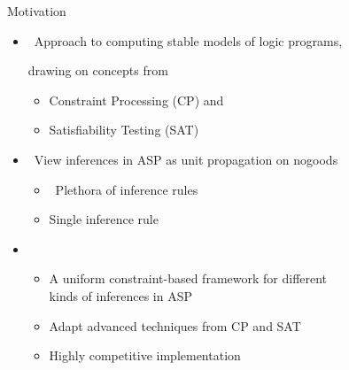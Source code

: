 \begin{frame}{Motivation}
  \bigskip
  \begin{itemize}
  \item<1-> \ Approach to computing stable models of logic programs,

    drawing on concepts from
    \begin{itemize}\normalsize
    \item Constraint Processing (CP) and
    \item Satisfiability Testing (SAT)
    \end{itemize}
    \medskip
  \item<2-> \ View inferences in ASP as unit propagation on nogoods
    \begin{itemize}\normalsize
    \item <only@3-4>  \ Plethora of inference rules
    \item <only@3-4>  \quad  Single inference rule
    \end{itemize}
    \medskip
  \item<only@5-> 
    \begin{itemize}\normalsize
    \item A uniform constraint-based framework for different\\ kinds of inferences in ASP
    \item Adapt advanced techniques from CP and SAT
    \item Highly competitive implementation
    \end{itemize}
  \end{itemize}
\end{frame}
%
